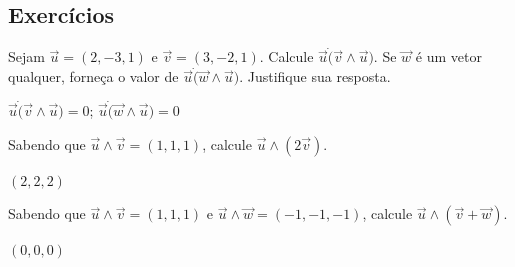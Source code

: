 \subsection*{Exercícios}

\begin{exer}
  Sejam $\vec{u}=(2,-3,1)$ e $\vec{v}=(3,-2,1)$. Calcule $\vec{u}\dot(\vec{v}\land\vec{u})$. Se $\vec{w}$ é um vetor qualquer, forneça o valor de $\vec{u}\dot(\vec{w}\land\vec{u})$. Justifique sua resposta.
\end{exer}
\begin{resp}
  $\vec{u}\dot(\vec{v}\land\vec{u})=0$; $\vec{u}\dot(\vec{w}\land\vec{u})=0$
\end{resp}

\begin{exer}
  Sabendo que $\vec{u}\land\vec{v}=(1,1,1)$, calcule $\vec{u}\land(2\vec{v})$.
\end{exer}
\begin{resp}
  $(2,2,2)$
\end{resp}

\begin{exer}
  Sabendo que $\vec{u}\land\vec{v}=(1,1,1)$ e $\vec{u}\land\vec{w}=(-1,-1,-1)$, calcule $\vec{u}\land(\vec{v} + \vec{w})$.
\end{exer}
\begin{resp}
  $(0,0,0)$
\end{resp}

\emconstrucao